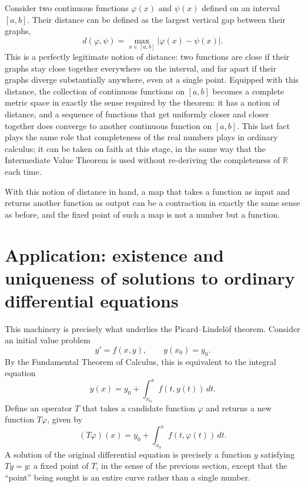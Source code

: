 \documentclass{essay}
\begin{document}
Consider two continuous functions $\varphi(x)$ and $\psi(x)$ defined
on an interval $[a, b]$. Their distance can be defined as the largest
vertical gap between their graphs,
\[
  d(\varphi, \psi) = \max_{x \in [a,b]} |\varphi(x) - \psi(x)|.
\]
This is a perfectly legitimate notion of distance: two functions are
close if their graphs stay close together everywhere on the
interval, and far apart if their graphs diverge substantially
anywhere, even at a single point. Equipped with this distance, the
collection of continuous functions on $[a,b]$ becomes a complete
metric space in exactly the sense required by the theorem: it has a
notion of distance, and a sequence of functions that get uniformly
closer and closer together does converge to another continuous
function on $[a,b]$. This last fact plays the same role that
completeness of the real numbers plays in ordinary calculus; it can
be taken on faith at this stage, in the same way that the
Intermediate Value Theorem is used without re-deriving the
completeness of $\mathbb{R}$ each time.

With this notion of distance in hand, a map that takes a function as
input and returns another function as output can be a contraction in
exactly the same sense as before, and the fixed point of such a map
is not a number but a function.

\section{Application: existence and uniqueness of solutions to ordinary differential equations}

This machinery is precisely what underlies the Picard--Lindel\"of
theorem. Consider an initial value problem
\[
  y' = f(x, y), \qquad y(x_0) = y_0.
\]
By the Fundamental Theorem of Calculus, this is equivalent to the
integral equation
\[
  y(x) = y_0 + \int_{x_0}^{x} f(t, y(t))\, dt.
\]
Define an operator $T$ that takes a candidate function $\varphi$ and
returns a new function $T\varphi$, given by
\[
  (T\varphi)(x) = y_0 + \int_{x_0}^{x} f(t, \varphi(t))\, dt.
\]
A solution of the original differential equation is precisely a
function $y$ satisfying $Ty = y$: a fixed point of $T$, in the sense
of the previous section, except that the ``point'' being sought is
an entire curve rather than a single number.
\end{document}
